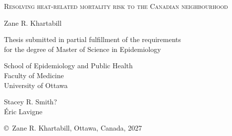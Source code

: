 \documentclass[letterpaper,12pt,titlepage,oneside,final]{book}
\def\doctitle{Resolving heat-related mortality risk to the Canadian neighbourhood}
\def\authorname{Zane R. Khartabill}
\def\supervisorname{Stacey R. Smith?}
\def\cosupervisorname{\'Eric Lavigne}
\def\departmentname{School of Epidemiology and Public Health}
\def\facultyname{Faculty of Medicine}
\def\degreename{Master of Science in Epidemiology}
\def\location{Ottawa, Canada}
\def\yearname{2027}
\def\universityname{University of Ottawa}
\begin{document}
\begin{titlepage}
\centering
\vspace*{2cm}
{\Large\scshape \doctitle \par}
\vspace{2.5cm}
{\large \authorname \par}
\vspace{2.5cm}
{Thesis submitted in partial fulfillment of the requirements\\
for the degree of \degreename \par}
\vspace{1.5cm}
{\departmentname \\ \facultyname \\ \universityname \par}
\vspace{2cm}
{ \supervisorname \\
 \cosupervisorname \par}
\vfill
{\copyright\ \authorname, \location, \yearname \par}
\end{titlepage}

\frontmatter
{}

% 
% 

\tableofcontents
\listoftables
\listoffigures


\mainmatter
\doublespacing
\pagestyle{fancy}
\rhead{}
\setlength{\headheight}{30pt}

\end{document}
